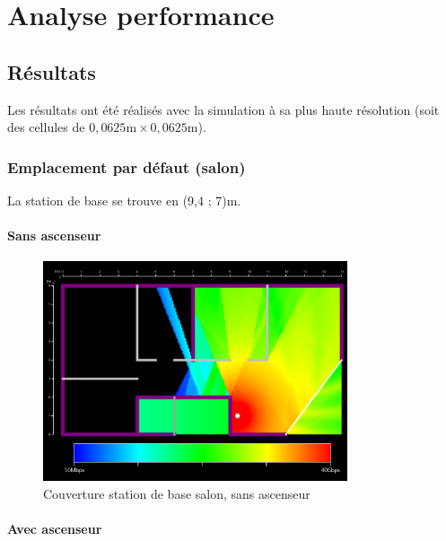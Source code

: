 \chapter{Analyse performance}
\label{chaper-4}




\section{Résultats}

Les résultats ont été réalisés avec la simulation à sa plus haute résolution (soit des cellules de $0,0625\mathrm{m}\times0,0625\mathrm{m}$).

\subsection{Emplacement par défaut (salon)}
La station de base se trouve en (9,4 ; 7)m.

\subsubsection{Sans ascenseur}

\begin{figure}[H]
    \centering
    \includegraphics[width=0.8\textwidth]{latex/images/highres-without-lift.png}
    \caption{Couverture station de base salon, sans ascenseur}
    \label{fig:simu-emplacement-defaut-sansasc}
\end{figure}
\subsubsection{Avec ascenseur}

